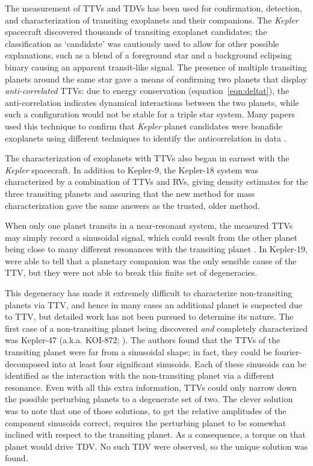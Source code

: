 \documentclass[graybox,natbib,nosecnum]{svmult}
\begin{document}
The measurement of TTVs and TDVs has been used for confirmation, detection, and characterization of
transiting exoplanets and their companions.  The \emph{Kepler} spacecraft discovered thousands of transiting
exoplanet candidates;  the classification as `candidate' was cautiously used to allow for other
possible explanations, such as a blend of a foreground star and a background eclipsing binary causing
an apparent transit-like signal.  The presence of multiple transiting planets around the same star
gave a means of confirming two planets that display {\em anti-correlated} TTVs: due to energy conservation (equation~\ref{eqn:deltat}), the anti-correlation indicates dynamical interactions between the
two planets, while such a configuration would not be stable for a triple star system.  Many papers
used this technique to confirm that \emph{Kepler} planet candidates were bonafide exoplanets using different techniques to identify the anticorrelation in data \citep{2012ApJ...750..113F,2012ApJ...756..185F,2012ApJ...750..114F,2012MNRAS.421.2342S,2013ApJS..208...22X}.

The characterization of exoplanets with TTVs also began in earnest with the \emph{Kepler} spacecraft.
In addition to Kepler-9, the Kepler-18 system was characterized by a combination of TTVs and
RVs, giving density estimates for the three transiting planets \citep{2011ApJS..197....7C} and assuring that the new method for mass characterization gave the same answers as the trusted, older method.

When only one planet transits in a near-resonant system, the measured TTVs may simply record a sinusoidal signal, which could result from the other planet being close to many different resonances with the transiting planet \citep{2010ApJ...718..543M}.  In Kepler-19, \cite{2011ApJ...743..200B} were able to tell that a planetary companion was the only sensible cause of the TTV, but they were not able to break this finite set of degeneracies. 

This degeneracy has made it extremely difficult to characterize non-transiting planets via TTV, and hence in many cases an additional planet is suspected due to TTV, but detailed work has not been pursued to determine its nature.  The first case of a non-transiting planet being discovered \emph{and} completely characterized was Kepler-47 (a.k.a. KOI-872; \citealt{2012Sci...336.1133N}).  The authors found that the TTVs of the transiting planet were far from a sinusoidal shape; in fact, they could be fourier-decomposed into at least four significant sinusoids.  Each of these sinusoids can be identified as the interaction with the non-transiting planet via a different resonance.  Even with all this extra information, TTVs could only narrow down the possible perturbing planets to a degenerate set of two.  The clever solution \citep{2012Sci...336.1133N} was to note that one of those solutions, to get the relative amplitudes of the component sinusoids correct,  requires the perturbing planet to be somewhat inclined with respect to the transiting planet.  As a consequence, a torque on that planet would drive TDV.  No such TDV were observed, so the unique solution was found. 
\end{document}
